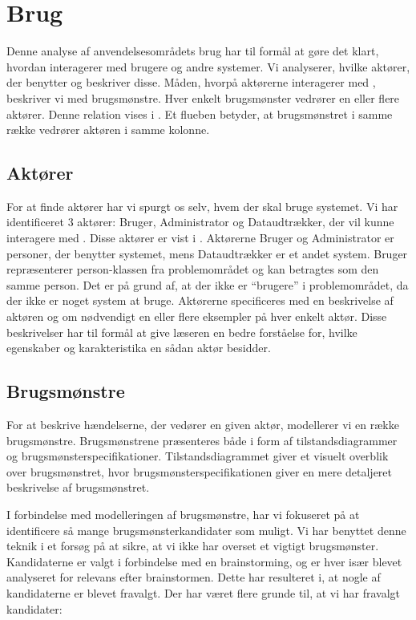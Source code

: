 \section{Brug}
\label{sec:brug}
Denne analyse af anvendelsesområdets brug har til formål at gøre det klart, hvordan \Foodl{} interagerer med brugere og andre systemer. Vi analyserer, hvilke aktører, der benytter \Foodl{} og beskriver disse. Måden, hvorpå aktørerne interagerer med \Foodl{}, beskriver vi med brugsmønstre. Hver enkelt brugsmønster vedrører en eller flere aktører. Denne relation vises i . Et flueben betyder, at brugsmønstret i samme række vedrører aktøren i samme kolonne.



\subsection{Aktører}
\label{sec:aktoerer}
For at finde aktører har vi spurgt os selv, hvem der skal bruge systemet. Vi har identificeret 3 aktører: Bruger, Administrator og Dataudtrækker, der vil kunne interagere med \Foodl{}. Disse aktører er vist i . Aktørerne Bruger og Administrator er personer, der benytter systemet, mens Dataudtrækker er et andet system. Bruger repræsenterer person-klassen fra problemområdet og kan betragtes som den samme person. Det er på grund af, at der ikke er ``brugere'' i problemområdet, da der ikke er noget system at bruge. Aktørerne specificeres med en beskrivelse af aktøren og om nødvendigt en eller flere eksempler på hver enkelt aktør. Disse beskrivelser har til formål at give læseren en bedre forståelse for, hvilke egenskaber og karakteristika en sådan aktør besidder. 



\subsection{Brugsmønstre}
\label{subsec:brugsmoenstre}
For at beskrive hændelserne, der vedører en given aktør, modellerer vi en række brugsmønstre. Brugsmønstrene præsenteres både i form af  tilstandsdiagrammer og brugsmønsterspecifikationer. Tilstandsdiagrammet giver et visuelt overblik over brugsmønstret, hvor brugsmønsterspecifikationen giver en mere detaljeret beskrivelse af brugsmønstret.

I forbindelse med modelleringen af brugsmønstre, har vi fokuseret på at identificere så mange brugsmønsterkandidater som muligt. Vi har benyttet denne teknik i et forsøg på at sikre, at vi ikke har overset et vigtigt brugsmønster. Kandidaterne er valgt i forbindelse med en brainstorming, og er hver især blevet analyseret for relevans efter brainstormen. Dette har resulteret i, at nogle af kandidaterne er blevet fravalgt. Der har været flere grunde til, at vi har fravalgt kandidater:

